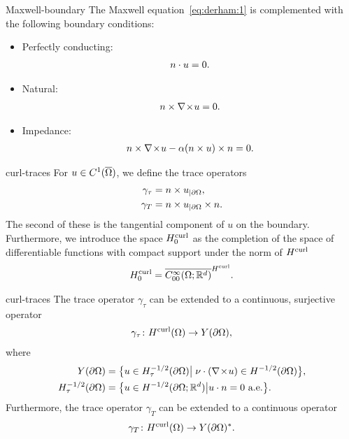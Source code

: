 \begin{Definition}{Maxwell-boundary}
  The Maxwell equation~\eqref{eq:derham:1} is complemented with the
  following boundary conditions:
  \begin{itemize}
  \item Perfectly conducting:
    \begin{gather}
      n\cdot u = 0.
    \end{gather}
    \item Natural:
      \begin{gather}
        n\times \nabla\!\times\! u = 0.
      \end{gather}
    \item Impedance:
      \begin{gather}
        n\times \nabla\!\times\! u - \alpha  (n\times u) \times n = 0.
      \end{gather}
  \end{itemize}
\end{Definition}


\begin{Definition}{curl-traces}
  For $u\in C^1(\overline{\Omega})$, we define the trace operators
  \begin{gather}
    \label{eq:derham:4}
    \begin{split}
      \gamma_{\tau} &= n\times u_{|\partial\Omega}, \\
      \gamma_{T} &= n\times u_{|\partial\Omega} \times n.\\
    \end{split}
  \end{gather}
  The second of these is the tangential component of $u$ on the
  boundary. Furthermore, we introduce the space $H^{\text{curl}}_0$ as the
  completion of the space of differentiable functions with compact
  support under the norm of $H^{\text{curl}}$
  \begin{gather}
    H^{\text{curl}}_0 = \overline{C^\infty_{00}(\Omega;\mathbb R^d)}^{H^{\text{curl}}}.
  \end{gather}
\end{Definition}


\begin{Theorem}{curl-traces}
  The trace operator $\gamma_\tau$ can be extended to a continuous,
  surjective operator
  \begin{gather*}
    \gamma_\tau \colon H^{\text{curl}}(\Omega) \to Y(\partial\Omega),
  \end{gather*}
  where
  \begin{gather}
    \label{eq:derham:5}
    \begin{split}
      Y(\partial\Omega) &= \bigl\{
      u\in H^{-1/2}_\tau(\partial\Omega) \big\vert
      \;\nu\cdot(\nabla\!\times\! u) \in H^{-1/2}(\partial\Omega) \bigr\},\\
      H^{-1/2}_\tau(\partial\Omega) &= \bigl\{
      u\in H^{-1/2}(\partial\Omega;\mathbb R^d) \big\vert 
      u\cdot n=0 \text{ a.e.}\bigr\}.
    \end{split}
  \end{gather}
  Furthermore, the trace operator $\gamma_T$ can be extended to a
  continuous operator
  \begin{gather*}
    \gamma_T \colon H^{\text{curl}}(\Omega) \to Y(\partial\Omega)^*.
  \end{gather*}
\end{Theorem}


